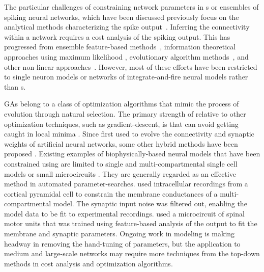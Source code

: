 \smallskip{} 

The particular challenges of constraining network parameters in {\BNN}s
or ensembles of spiking neural networks, which have been discussed
previously \citep{EggertHemmen:2001,Brette:2007} focus on the
analytical methods characterizing the spike output~\citep{Victor:2005,KostalLanskyEtAl:2007,BrownKassEtAl:2004}. Inferring
the connectivity within a network requires a cost analysis of the
spiking output.  This has progressed from ensemble feature-based
methods~\citep{SameshimaBaccala:1999,DahlhausEichlerEtAl:1997,TheunissenSenEtAl:2000},
information theoretical approaches using maximum likelihood
\citep{YamadaMatsumotoEtAl:1996,Chichilnisky:2001,OkatanWilsonEtAl:2005,PaninskiPillowEtAl:2004},
evolutionary algorithm methods~\citep{TakahamaSakai:2005,Yao:1999},
and other non-linear approaches~\citep{Eblen-ZajjurSalasEtAl:1999}.
However, most of these efforts have been restricted to single neuron
models or networks of integrate-and-fire neural models rather than
{\BNN}s.

\smallskip{} 

\Glspl{GA} belong to a class of optimization algorithms
that mimic the process of evolution through natural selection. The
primary strength of {\GAs} relative to other optimization techniques,
such as gradient-descent, is that {\GAs} can avoid getting caught in
local minima \citep{Goldberg:1989,Whitley:1995}. Since
\citet{Holland:1975} first used {\GAs} to evolve the connectivity and
synaptic weights of artificial neural networks, some other hybrid
methods have been proposed \citep{Yao:1999,Whitley:1995}. Existing
examples of biophysically-based neural models that have been
constrained using {\GAs} are limited to single and multi-compartmental
single cell models \citep{KerenPeledEtAl:2005,VanierBower:1999,VanDeEtAl:2008} or small
microcircuits \citep{TaylorEnoka:2004}.  They are generally regarded
as an effective method in automated
parameter-searches. \citet{KerenPeledEtAl:2005} used intracellular
recordings from a cortical pyramidal cell to constrain the membrane
conductances of a multi-compartmental model.  The synaptic input noise
was filtered out, enabling the model data to be fit to experimental
recordings. \citet{TaylorEnoka:2004} used a microcircuit of spinal
motor units that was trained using feature-based analysis of the
output to fit the membrane and synaptic parameters.  Ongoing work in
{\BNN} modeling \citep{VanierBower:1999,VanDeEtAl:2008} is making headway
in removing the hand-tuning of parameters, but the application to
medium and large-scale networks may require more techniques from the
top-down methods in cost analysis and optimization algorithms.

